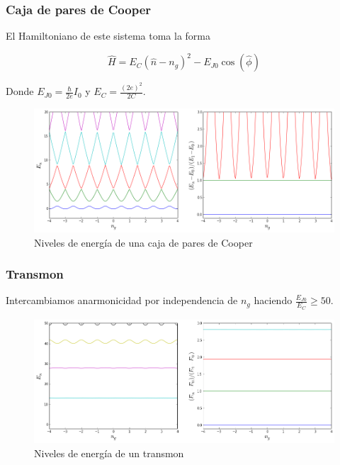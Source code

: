 \documentclass[xetex,mathserif,serif, 8pt]{beamer}
\begin{document}
\begin{frame}
 \frametitle{Caja de pares de Cooper}

    El Hamiltoniano de este sistema toma la forma

    \begin{equation}
        \hat{H} = E_C (\hat{n}-n_g)^2 - E_{J0} \cos( \hat{\phi} )
    \end{equation}

    Donde $E_{J0} = \frac{\hbar}{2e} I_0$ y $E_C = \frac{(2e)^2}{2C}$.

    \begin{figure}[H]
    \centering \includegraphics[width=0.8\linewidth]{md/Avance1/cooperenergy.png}
    \caption{Niveles de energía de una caja de pares de Cooper}
    \label{fig:cooperpairboxenergy}
    \end{figure}

\end{frame}

\begin{frame}
    \frametitle{Transmon}

    Intercambiamos anarmonicidad por independencia de $n_g$ haciendo $\frac{E_{J0}}{E_C} \geq 50$.

    \begin{figure}[H]
    \centering \includegraphics[width=0.8\linewidth]{md/Avance1/transmonenergy.png}
    \caption{Niveles de energía de un transmon}
    \label{fig:transmonenergy}
    \end{figure}

\end{frame}
\end{document}
